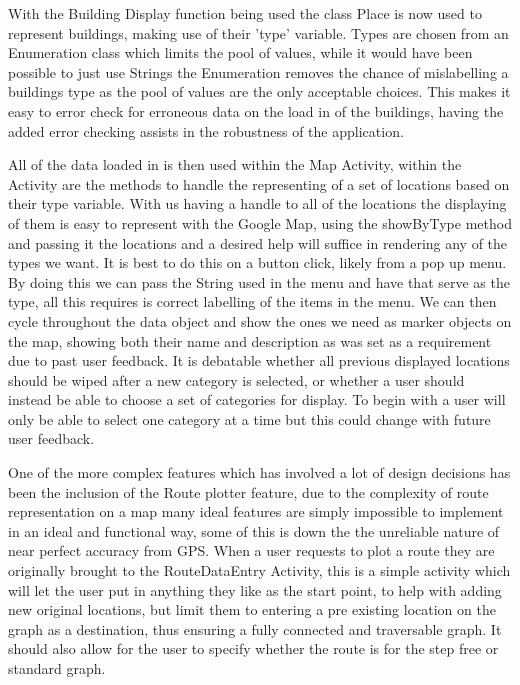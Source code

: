 With the Building Display function being used the class Place is now used to represent buildings, making use of their 'type' variable. Types are chosen from an Enumeration class which limits the pool of values, while it would have been possible to just use Strings the Enumeration removes the chance of mislabelling a buildings type as the pool of values are the only acceptable choices. This makes it easy to error check for erroneous data on the load in of the buildings, having the added error checking assists in the robustness of the application. 

All of the data loaded in is then used within the Map Activity, within the Activity are the methods to handle the representing of a set of locations based on their type variable. With us having a handle to all of the locations the displaying of them is easy to represent with the Google Map, using the showByType method and passing it the locations and a desired help will suffice in rendering any of the types we want. It is best to do this on a button click, likely from a pop up menu. By doing this we can pass the String used in the menu and have that serve as the type, all this requires is correct labelling of the items in the menu. We can then cycle throughout the data object and show the ones we need as marker objects on the map, showing both their name and description as was set as a requirement due to past user feedback. It is debatable whether all previous displayed locations should be wiped after a new category is selected, or whether a user should instead be able to choose a set of categories for display. To begin with a user will only be able to select one category at a time but this could change with future user feedback. 

One of the more complex features which has involved a lot of design decisions has been the inclusion of the Route plotter feature, due to the complexity of route representation on a map many ideal features are simply impossible to implement in an ideal and functional way, some of this is down the the unreliable nature of near perfect accuracy from GPS. When a user requests to plot a route they are originally brought to the RouteDataEntry Activity, this is a simple activity which will let the user put in anything they like as the start point, to help with adding new original locations, but limit them to entering a pre existing location on the graph as a destination, thus ensuring a fully connected and traversable graph. It should also allow for the user to specify whether the route is for the step free or standard graph. 

